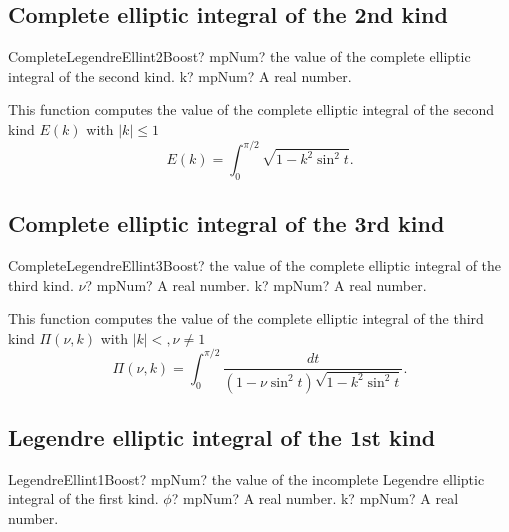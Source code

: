 \subsection{Complete elliptic integral of the 2nd kind}

\begin{mpFunctionsExtract}
	\mpFunctionOne
	{CompleteLegendreEllint2Boost? mpNum? the value of the complete elliptic integral of the second kind.}
	{k? mpNum? A real number.}
\end{mpFunctionsExtract}

\vspace{0.3cm}
This function computes the value of the complete elliptic integral of the second kind
$E(k)$ with $|k| \leq 1$
\begin{equation}
	E(k)=\int_0^{\pi/2} \sqrt{1-k^2 \sin^2 t}.
\end{equation}





\subsection{Complete elliptic integral of the 3rd kind}

\begin{mpFunctionsExtract}
	\mpFunctionTwo
	{CompleteLegendreEllint3Boost? the value of the complete elliptic integral of the third kind.}
	{$\nu$? mpNum? A real number.}
	{k? mpNum? A real number.}
\end{mpFunctionsExtract}

\vspace{0.3cm}
This function computes the value of the complete elliptic integral of the third kind
$\Pi(\nu,k)$ with $|k| < , \nu \neq 1$
\begin{equation}
	\Pi(\nu,k)=\int_0^{\pi/2} \frac{dt}{(1-\nu \sin^2 t)\sqrt{1-k^2 \sin^2 t}}.
\end{equation}



\subsection{Legendre elliptic integral of the 1st kind}
\label{Legendre elliptic integral of the 1st kind Boost}

\begin{mpFunctionsExtract}
	\mpFunctionTwo
	{LegendreEllint1Boost? mpNum? the value of the incomplete Legendre elliptic integral of the first kind.}
	{$\phi$? mpNum? A real number.}
	{k? mpNum? A real number.}
\end{mpFunctionsExtract}

